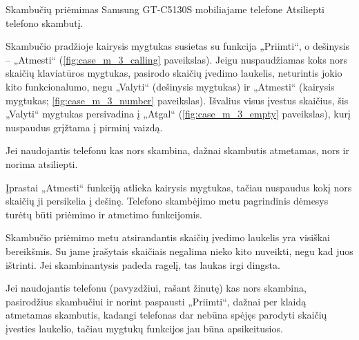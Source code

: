 \begin{xcase}{Skambučių priėmimas Samsung GT-C5130S mobiliajame telefone}
  \xcgoal
  {
    Atsiliepti telefono skambutį.
  }
  
  \xctools
  {
    Skambučio pradžioje kairysis mygtukas susietas su funkcija „Priimti“, o
    dešinysis – „Atmesti“ (\ref{fig:case_m_3_calling} paveikslas). Jeigu nuspaudžiamas
    koks nors skaičių klaviatūros mygtukas, pasirodo skaičių įvedimo laukelis,
    neturintis jokio kito funkcionalumo, negu „Valyti“ (dešinysis mygtukas) ir
    „Atmesti“ (kairysis mygtukas; \ref{fig:case_m_3_number} paveikslas). Išvalius
    visus įvestus skaičius, šis „Valyti“ mygtukas persivadina į „Atgal“
    (\ref{fig:case_m_3_empty} paveikslas), kurį nuspaudus grįžtama į pirminį vaizdą.

    {
    }
  }
  
  \xcresult
  {
    Jei naudojantis telefonu kas nors skambina, dažnai skambutis atmetamas,
    nors ir norima atsiliepti.
  }
  
  \xcprinciples
  {
    {
      Įprastai „Atmesti“ funkciją atlieka kairysis mygtukas, tačiau
      nuspaudus kokį nors skaičių ji persikelia į dešinę. Telefono
      skambėjimo metu pagrindinis dėmesys turėtų būti priėmimo ir atmetimo
      funkcijomis.
    }
  }
  
  \xcthoughts
  {
    Skambučio priėmimo metu atsirandantis skaičių įvedimo laukelis yra
    visiškai bereikšmis. Su jame įrašytais skaičiais negalima nieko kito
    nuveikti, negu kad juos ištrinti. Jei skambinantysis padeda ragelį,
    tas laukas irgi dingsta.

    Jei naudojantis telefonu (pavyzdžiui, rašant žinutę) kas nors skambina,
    pasirodžius skambučiui ir norint paspausti „Priimti“, dažnai per klaidą
    atmetamas skambutis, kadangi telefonas dar nebūna spėjęs parodyti
    skaičių įvesties laukelio, tačiau mygtukų funkcijos jau būna
    apsikeitusios.
  }
\end{xcase}
